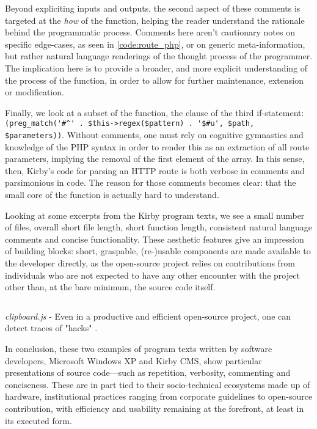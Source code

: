 Beyond expliciting inputs and outputs, the second aspect of these comments is targeted at the \emph{how} of the function, helping the reader understand the rationale behind the programmatic process. Comments here aren't cautionary notes on specific edge-cases, as seen in \autoref{code:route_php}, or on generic meta-information, but rather natural language renderings of the thought process of the programmer. The implication here is to provide a broader, and more explicit understanding of the process of the function, in order to allow for further maintenance, extension or modification.

Finally, we look at a subset of the function, the clause of the third if-statement: \lstinline{(preg_match('#^' . $this->regex($pattern) . '$#u', $path, $parameters))}. Without comments, one must rely on cognitive gymnastics and knowledge of the PHP syntax in order to render this as an extraction of all route parameters, implying the removal of the first element of the array. In this sense, then, Kirby's code for parsing an HTTP route is both verbose in comments and parsimonious in code. The reason for those comments becomes clear: that the small core of the function is actually hard to understand.

Looking at some excerpts from the Kirby program texts, we see a small number of files, overall short file length, short function length, consistent natural language comments and concise functionality. These aesthetic features give an impression of building blocks: short, graspable, (re-)usable components are made available to the developer directly, as the open-source project relies on contributions from individuals who are not expected to have any other encounter with the project other than, at the bare minimum, the source code itself.

\begin{listing}
  \inputminted{js}{./corpus/clipboard.js}
  \caption{\emph{clipboard.js} - Even in a productive and efficient open-source project, one can detect traces of "hacks" \citep{allgeier_clipboard_2021}.}
  \label{code:clipboard_js}
\end{listing}

In conclusion, these two examples of program texts written by software developers, Microsoft Windows XP and Kirby CMS, show particular presentations of source code—such as repetition, verbosity, commenting and conciseness. These are in part tied to their socio-technical ecosystems made up of hardware, institutional practices ranging from corporate guidelines to open-source contribution, with efficiency and usability remaining at the forefront, at least in its executed form.

